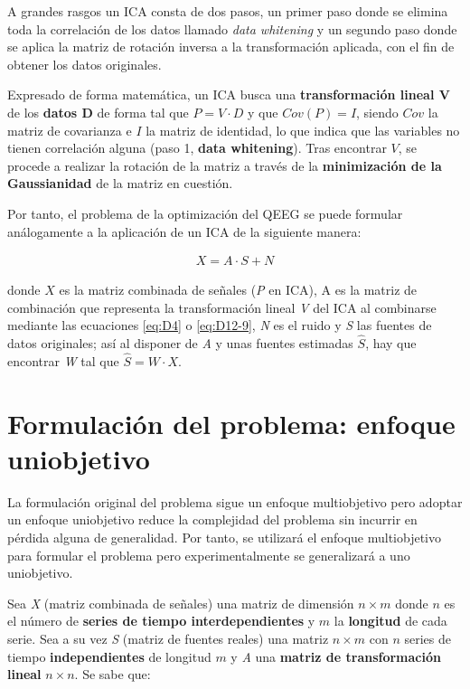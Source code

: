 A grandes rasgos un ICA consta de dos pasos, un primer paso donde se elimina toda la correlación de los datos llamado \textit{data whitening} y un segundo paso donde se aplica la matriz de rotación inversa a la transformación aplicada, con el fin de obtener los datos originales.

 Expresado de forma matemática, un ICA busca una \textbf{transformación lineal V} de los \textbf{datos D} de forma tal que $P = V\cdot D$ y que $Cov(P) = I$, siendo $Cov$ la matriz de covarianza e $I$ la matriz de identidad, lo que indica que las variables no tienen correlación alguna (paso 1, \textbf{data whitening}). Tras encontrar $V$, se procede a realizar la rotación de la matriz a través de la \textbf{minimización de la Gaussianidad} de la matriz en cuestión.
 
 Por tanto, el problema de la optimización del QEEG se puede formular análogamente a la aplicación de un ICA de la siguiente manera:
 
 \begin{equation} \label{eq: problem1}
	 \begin{gathered}
		X = A\cdot S + N
	 \end{gathered}
 \end{equation}
 
 donde $X$ es la matriz combinada de señales (\textit{P} en ICA), A es la matriz de combinación que representa la transformación lineal \textit{V} del ICA al combinarse mediante las ecuaciones \ref{eq:D4} o \ref{eq:D12-9}, \textit{N} es el ruido y \textit{S} las fuentes de datos originales; así al disponer de \textit{A} y unas fuentes estimadas $\hat{S}$, hay que encontrar \textit{W} tal que $\hat{S} = W\cdot X$.
 
 \section{Formulación del problema: enfoque uniobjetivo}
 
 La formulación original del problema sigue un enfoque multiobjetivo pero adoptar un enfoque uniobjetivo reduce la complejidad del problema sin incurrir en pérdida alguna de generalidad. Por tanto, se utilizará el enfoque multiobjetivo para formular el problema pero experimentalmente se generalizará a uno uniobjetivo.
 
 Sea \textit{X} (matriz combinada de señales) una matriz de dimensión $n\times m$ donde $n$ es el número de \textbf{series de tiempo interdependientes} y $m$ la \textbf{longitud} de cada serie. Sea a su vez \textit{S} (matriz de fuentes reales) una matriz $n\times m$ con $n$ series de tiempo \textbf{independientes} de longitud $m$ y \textit{A} una \textbf{matriz de transformación lineal} $n\times n$. Se sabe que:
 
